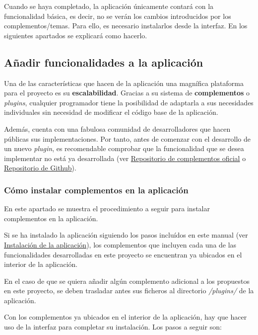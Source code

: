 Cuando se haya completado, la aplicación únicamente contará con la funcionalidad
básica, es decir, no se verán los cambios introducidos por los
complementos/temas. Para ello, es necesario instalarlos desde la
interfaz. En los siguientes apartados se explicará como hacerlo.

\subsection{Añadir funcionalidades a la aplicación}

Una de las características que hacen de la aplicación una magnífica
plataforma para el proyecto es su \textbf{escalabilidad}. Gracias a su
sistema de \textbf{complementos} o \emph{plugins}, cualquier programador
tiene la posibilidad de adaptarla a sus necesidades individuales sin
necesidad de modificar el código base de la aplicación.

Además, cuenta con una fabulosa comunidad de desarrolladores que hacen
públicas sus implementaciones. Por tanto, antes de comenzar con el
desarrollo de un nuevo \emph{plugin}, es recomendable comprobar que la
funcionalidad que se desea implementar no está ya desarrollada (ver
\href{https://omeka.org/classic/plugins/}{Repositorio de complementos
oficial} o
\href{https://daniel-km.github.io/UpgradeToOmekaS/omeka_plugins.html}{Repositorio
de Github}).


\subsubsection{Cómo instalar complementos en la aplicación}

En este apartado se muestra el procedimiento a seguir para instalar
complementos en la aplicación.

Si se ha instalado la aplicación siguiendo los pasos incluídos en este
manual (ver
\protect\hyperlink{instalaciuxf3n-de-la-aplicaciuxf3n}{Instalación de la
aplicación}), los complementos que incluyen cada una de las
funcionalidades desarrolladas en este proyecto se encuentran ya ubicados
en el interior de la aplicación.

En el caso de que se quiera añadir algún complemento adicional a los
propuestos en este proyecto, se deben trasladar antes sus ficheros al
directorio \emph{/plugins/} de la aplicación.

Con los complementos ya ubicados en el interior de la aplicación, hay
que hacer uso de la interfaz para completar su instalación. Los pasos a
seguir son:

